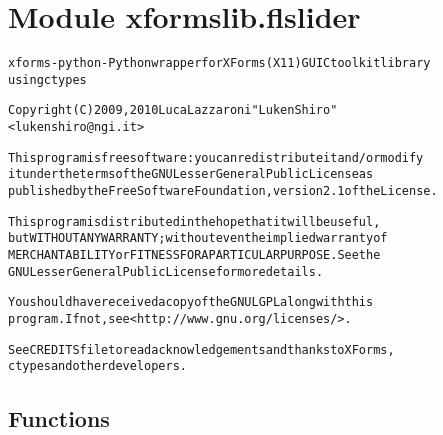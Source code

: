 %
%
%


\section{Module xformslib.flslider}

    \label{xformslib:flslider}
\begin{alltt}

xforms-python - Python wrapper for XForms (X11) GUI C toolkit library
using ctypes

Copyright (C) 2009, 2010  Luca Lazzaroni "LukenShiro"
    {\textless}lukenshiro@ngi.it{\textgreater}

This program is free software: you can redistribute it and/or modify
it under the terms of the GNU Lesser General Public License as
published by the Free Software Foundation, version 2.1 of the License.

This program is distributed in the hope that it will be useful,
but WITHOUT ANY WARRANTY; without even the implied warranty of
MERCHANTABILITY or FITNESS FOR A PARTICULAR PURPOSE. See the
GNU Lesser General Public License for more details.

You should have received a copy of the GNU LGPL along with this
program. If not, see {\textless}http://www.gnu.org/licenses/{\textgreater}.

See CREDITS file to read acknowledgements and thanks to XForms,
ctypes and other developers.
\end{alltt}



  \subsection{Functions}

    \label{xformslib:flslider:fl_add_slider}

